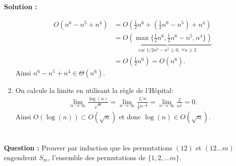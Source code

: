 \documentclass[11pt]{article} %
\newenvironment{question}[1][\unskip]{%
	\par
	\noindent
	\textbf{Question #1:}
	\noindent}
{\medskip}
\newenvironment{solution}[1][\unskip]{%
	\par
	\noindent
	\textbf{Solution #1:}
	\noindent}
{\medskip}
\begin{document}
\begin{solution}
\begin{enumerate}
{			\begin{align*}
			O(n^6 -n^5 +n^4)&=O(\frac{1}{2}n^6+ (\frac{1}{2}n^6 - n^5)+n^4)\\
			&=\underbrace{O(\max\{\frac{1}{2}n^6,\frac{1}{2}n^6 - n^5,n^4\})}_{\text{car } 1/2n^6-n^5 \geq 0, \ \forall n \geq 2}\\
			&=O(\frac{1}{2}n^6) = O(n^6).
			\end{align*}
			Ainsi $n^6-n^5+n^4 \in \Theta(n^6)$.}
		\item{On calcule la limite en utilisant la règle de l'Hôpital:
			\begin{align*}
			\lim\limits_{n\rightarrow \infty}\frac{\log(n)}{\sqrt{n}}=\lim\limits_{n\rightarrow \infty}\frac{1/n}{\frac{1}{2}n^{-\frac{1}{2}}}=\lim\limits_{n\rightarrow \infty}\frac{2}{n^{\frac{1}{2}}}=0.
			\end{align*}
			Ainsi $O(\log(n)) \subset O(\sqrt{n})$ et donc $\log(n) \in O(\sqrt{n})$.}
	\end{enumerate}
\end{solution}

\section{}

\begin{question}
	Prouver par induction que les permutations $(12)$ et $(12 \dots m)$ engendrent $S_m$, l'ensemble des permutations de $\{1,2, \dots m\}$.
\end{question}
\end{document}
